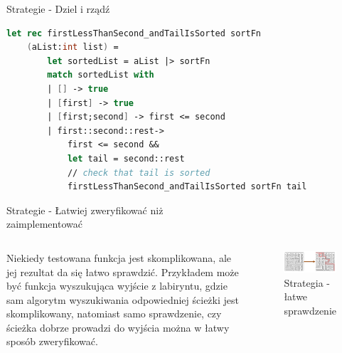\begin{frame}[fragile]{Strategie - Dziel i rządź}
    \begin{lstlisting}[language=FSharp, xleftmargin=-10pt,xrightmargin=-10pt,numbers=none, basicstyle=\ttfamily\small]
    let rec firstLessThanSecond_andTailIsSorted sortFn 
    (aList:int list) =
        let sortedList = aList |> sortFn
        match sortedList with
        | [] -> true
        | [first] -> true
        | [first;second] -> first <= second
        | first::second::rest->
            first <= second &&
            let tail = second::rest
            // check that tail is sorted
            firstLessThanSecond_andTailIsSorted sortFn tail
    \end{lstlisting}
\end{frame}

\begin{frame}{Strategie - Łatwiej zweryfikować niż\\zaimplementować}
    \begin{columns}[t]
            Niekiedy testowana funkcja jest skomplikowana, ale jej rezultat da się łatwo sprawdzić. Przykładem może być funkcja wyszukująca wyjście z labiryntu, gdzie sam algorytm wyszukiwania odpowiedniej ścieżki jest skomplikowany, 
            natomiast samo sprawdzenie, czy ścieżka dobrze prowadzi do wyjścia można w łatwy sposób zweryfikować.
        \centering
        \begin{figure}
            \centering
            \includegraphics[width=1\textwidth]{images/property_easy_verification.png}
            \caption{Strategia - łatwe sprawdzenie}
            \label{fig:easy_verification_strategy}
        \end{figure}    
    \end{columns}
\end{frame}

